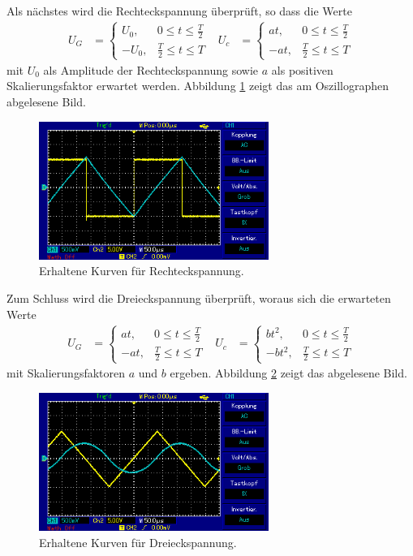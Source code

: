 Als nächstes wird die Rechteckspannung überprüft, so dass die Werte
\begin{align}
  U_G &=
  \begin{cases}
    U_0 , &  0 \leq t \leq \frac{T}{2} \\
    -U_0 , & \frac{T}{2} \leq t \leq T
  \end{cases}
   & U_c &=
  \begin{cases}
    at , &  0 \leq t \leq \frac{T}{2} \\
    -at , & \frac{T}{2} \leq t \leq T
  \end{cases}
\end{align}
mit $U_0$ als Amplitude der Rechteckspannung sowie $a$ als positiven Skalierungsfaktor erwartet werden.
Abbildung \ref{fig:rechteck_s} zeigt das am Oszillographen abgelesene Bild.

\begin{figure}[H]
  \centering
  \includegraphics[height=4.5cm]{oz7.png}
  \caption{Erhaltene Kurven für Rechteckspannung.}
  \label{fig:rechteck_s}
\end{figure}

Zum Schluss wird die Dreieckspannung überprüft, woraus sich die erwarteten Werte
\begin{align}
  U_G &=
  \begin{cases}
    at , &  0 \leq t \leq \frac{T}{2} \\
    -at , & \frac{T}{2} \leq t \leq T
  \end{cases}
  & U_c &=
  \begin{cases}
    b t^2 , &  0 \leq t \leq \frac{T}{2} \\
    -b t^2 , & \frac{T}{2} \leq t \leq T
  \end{cases}
\end{align}
mit Skalierungsfaktoren $a$ und $b$ ergeben.
Abbildung \ref{fig:s_s} zeigt das abgelesene Bild.

\begin{figure}[H]
  \centering
  \includegraphics[height=4.5cm]{oz6.png}
  \caption{Erhaltene Kurven für Dreieckspannung.}
  \label{fig:s_s}
\end{figure}
